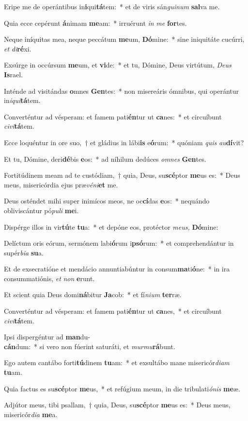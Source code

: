 \item Eripe me de operántibus in\textbf{i}qui\textbf{tá}tem:~* et de viris sán\textit{guinum} \textbf{sal}va me.
\item Quia ecce cepérunt \textbf{á}nimam \textbf{me}am:~* irruérunt \textit{in} \textit{me} \textbf{for}tes.
\item Neque iníquitas mea, neque peccátum \textbf{me}um, \textbf{Dó}mine:~* sine iniquitáte cucúrri, \textit{et} \textit{di}\textbf{ré}xi.
\item Exsúrge in occúrsum \textbf{me}um, et \textbf{vi}de:~* et tu, Dómine, Deus virtútum, \textit{Deus} \textbf{Is}rael.
\item Inténde ad visitándas \textbf{o}mnes \textbf{Gen}tes:~* non misereáris ómnibus, qui operántur in\textit{iqui}\textbf{tá}tem.
\item Converténtur ad vésperam: et famem pati\textbf{én}tur ut \textbf{ca}nes:~* et circuíbunt \textit{civi}\textbf{tá}tem.
\item Ecce loquéntur in ore suo,~† et gládius in lábi\textbf{is} e\textbf{ó}rum:~* quóniam \textit{quis} \textit{au}\textbf{dí}vit?
\item Et tu, Dómine, deri\textbf{dé}bis \textbf{e}os:~* ad níhilum dedúces \textit{omnes} \textbf{Gen}tes.
\item Fortitúdinem meam ad te custódiam,~† quia, Deus, su\textbf{scé}ptor \textbf{me}us es:~* Deus meus, misericórdia ejus præ\textit{véni}\textbf{et} me.
\item Deus osténdet mihi super inimícos meos, ne oc\textbf{cí}das \textbf{e}os:~* nequándo obliviscántur pó\textit{puli} \textbf{me}i.
\item Dispérge illos in vir\textbf{tú}te \textbf{tu}a:~* et depóne eos, protéctor \textit{meus,} \textbf{Dó}mine:
\item Delíctum oris eórum, sermónem labi\textbf{ó}rum i\textbf{psó}rum:~* et comprehendántur in supér\textit{bia} \textbf{su}a.
\item Et de exsecratióne et mendácio annuntiabúntur in consum\textbf{ma}ti\textbf{ó}ne:~* in ira consummatiónis, \textit{et} \textit{non} \textbf{e}runt.
\item Et scient quia Deus domi\textbf{ná}bitur \textbf{Ja}cob:~* et fí\textit{nium} \textbf{ter}ræ.
\item Converténtur ad vésperam: et famem pati\textbf{én}tur ut \textbf{ca}nes,~* et circuíbunt \textit{civi}\textbf{tá}tem.
\item Ipsi dispergéntur ad \textbf{man}du-\\\textbf{cán}dum:~* si vero non fúerint saturáti, et \textit{murmu}\textbf{rá}bunt.
\item Ego autem cantábo forti\textbf{tú}dinem \textbf{tu}am:~* et exsultábo mane misericór\textit{diam} \textbf{tu}am.
\item Quia factus es su\textbf{scé}ptor \textbf{me}us,~* et refúgium meum, in die tribulati\tinyhspace\textit{ónis} \textbf{me}æ.
\item Adjútor meus, tibi psallam,~† quia, Deus, su\textbf{scé}ptor \textbf{me}us es:~* Deus meus, misericór\textit{dia} \textbf{me}a.
